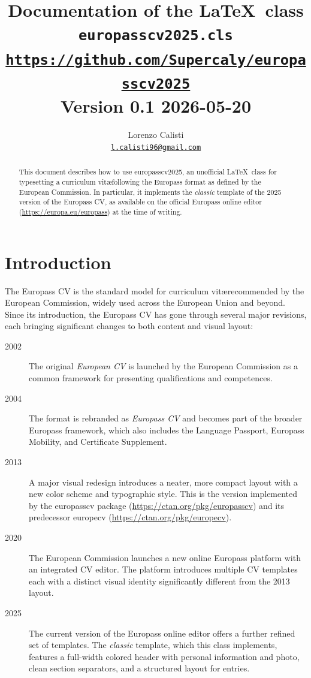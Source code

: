 \documentclass[a4paper, 12pt]{article}
\title{
    Documentation of the \LaTeX\ class\\
    \Large\textbf{\texttt{europasscv2025.cls}}\\
    \normalsize{\href{https://github.com/Supercaly/europasscv2025}{\texttt{https://github.com/Supercaly/europasscv2025}}}\\
    \vspace{0.2cm}\normalsize Version 0.1 2026-05-20
}
\author{
    Lorenzo Calisti\\
    \href{mailto:l.calisti96@gmail.com}{\texttt{l.calisti96@gmail.com}}
}
\newcommand{\pkg}[1]{\textsf{#1}}
\begin{document}
\maketitle
\clearpage

\begin{abstract}
This document describes how to use \pkg{europasscv2025}, an unofficial \LaTeX\ class for 
typesetting a curriculum vit\ae following the Europass format as defined by the European
Commission. In particular, it implements the \emph{classic} template of
the 2025 version of the Europass CV, as available on the official Europass
online editor (\url{https://europa.eu/europass}) at the time of writing.
\end{abstract}

\tableofcontents
\clearpage

\section{Introduction}

The Europass CV is the standard model for curriculum vit\ae recommended by
the European Commission, widely used across the European Union and beyond.
Since its introduction, the Europass CV has gone through several major
revisions, each bringing significant changes to both content and visual
layout:

\begin{description}
    \item[2002] The original \emph{European CV} is launched by the European
        Commission as a common framework for presenting qualifications and
        competences.
    \item[2004] The format is rebranded as \emph{Europass CV} and becomes
        part of the broader Europass framework, which also includes the
        Language Passport, Europass Mobility, and Certificate Supplement.
    \item[2013] A major visual redesign introduces a neater, more compact
        layout with a new color scheme and typographic style. This is the
        version implemented by the \pkg{europasscv} package
        (\url{https://ctan.org/pkg/europasscv}) and its predecessor
        \pkg{europecv} (\url{https://ctan.org/pkg/europecv}).
    \item[2020] The European Commission launches a new online Europass
        platform with an integrated CV editor. The platform introduces
        multiple CV templates each with a distinct visual identity significantly
        different from the 2013 layout.
    \item[2025] The current version of the Europass online editor offers
        a further refined set of templates. The \emph{classic} template,
        which this class implements, features a full-width colored header
        with personal information and photo, clean section separators, and
        a structured layout for entries.
\end{description}
\end{document}
